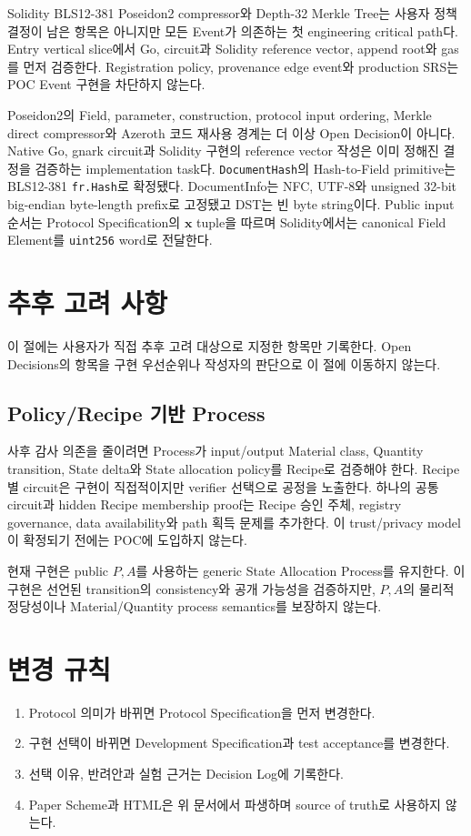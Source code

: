 \documentclass[11pt,a4paper]{extarticle}
\begin{document}
Solidity BLS12-381 Poseidon2 compressor와 Depth-32 Merkle Tree는 사용자 정책 결정이
남은 항목은 아니지만 모든 Event가 의존하는 첫 engineering critical path다. Entry
vertical slice에서 Go, circuit과 Solidity reference vector, append root와 gas를 먼저
검증한다. Registration policy, provenance edge event와 production SRS는 POC Event 구현을
차단하지 않는다.

Poseidon2의 Field, parameter, construction, protocol input ordering, Merkle direct
compressor와 Azeroth 코드 재사용 경계는 더 이상 Open Decision이 아니다. Native Go,
gnark circuit과 Solidity 구현의 reference vector 작성은 이미 정해진 결정을 검증하는
implementation task다. \texttt{DocumentHash}의 Hash-to-Field primitive는
BLS12-381 \texttt{fr.Hash}로 확정됐다. DocumentInfo는 NFC, UTF-8와 unsigned
32-bit big-endian byte-length prefix로 고정됐고 DST는 빈 byte string이다. Public input
순서는 Protocol Specification의 $\mathbf{x}$ tuple을 따르며 Solidity에서는 canonical
Field Element를 \texttt{uint256} word로 전달한다.

\section{추후 고려 사항}

이 절에는 사용자가 직접 추후 고려 대상으로 지정한 항목만 기록한다. Open Decisions의
항목을 구현 우선순위나 작성자의 판단으로 이 절에 이동하지 않는다.

\subsection{Policy/Recipe 기반 Process}

사후 감사 의존을 줄이려면 Process가 input/output Material class, Quantity transition,
State delta와 State allocation policy를 Recipe로 검증해야 한다. Recipe별 circuit은
구현이 직접적이지만 verifier 선택으로 공정을 노출한다. 하나의 공통 circuit과 hidden
Recipe membership proof는 Recipe 승인 주체, registry governance, data availability와
path 획득 문제를 추가한다. 이 trust/privacy model이 확정되기 전에는 POC에 도입하지
않는다.

현재 구현은 public $P,A$를 사용하는 generic State Allocation Process를 유지한다.
이 구현은 선언된 transition의 consistency와 공개 가능성을 검증하지만, $P,A$의 물리적
정당성이나 Material/Quantity process semantics를 보장하지 않는다.

\section{변경 규칙}

\begin{enumerate}
  \item Protocol 의미가 바뀌면 Protocol Specification을 먼저 변경한다.
  \item 구현 선택이 바뀌면 Development Specification과 test acceptance를 변경한다.
  \item 선택 이유, 반려안과 실험 근거는 Decision Log에 기록한다.
  \item Paper Scheme과 HTML은 위 문서에서 파생하며 source of truth로 사용하지 않는다.
\end{enumerate}
\end{document}
